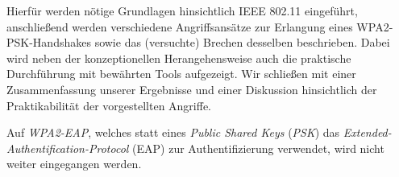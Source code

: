 Hierfür werden nötige Grundlagen hinsichtlich IEEE 802.11 eingeführt, anschließend werden verschiedene Angriffsansätze zur Erlangung eines WPA2-PSK-Handshakes sowie das (versuchte) Brechen desselben beschrieben. 
Dabei wird neben der konzeptionellen Herangehensweise auch die praktische Durchführung mit bewährten Tools aufgezeigt. 
Wir schließen mit einer Zusammenfassung unserer Ergebnisse und einer Diskussion hinsichtlich der Praktikabilität der vorgestellten Angriffe.

Auf \textit{WPA2-EAP}, welches statt eines \textit{Public Shared Keys} (\textit{PSK}) das \textit{Extended-Authentification-Protocol} (EAP) zur Authentifizierung verwendet, wird nicht weiter eingegangen werden.
